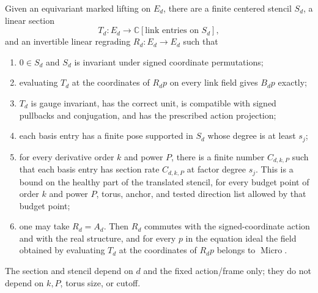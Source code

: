 \begin{theorem}
\label{thm:ex-marked-portfolio-section}
Given an equivariant marked lifting on $E_d$, there are a finite centered stencil $S_d$, a linear section
\[
       T_d:E_d\longrightarrow\mathbb C[\text{link entries on }S_d],
\]
and an invertible linear regrading $R_d:E_d\to E_d$ such that
\begin{enumerate}
\item $0\in S_d$ and $S_d$ is invariant under signed coordinate
  permutations;
\item evaluating $T_d$ at the coordinates of $R_dp$ on every link field
  gives $B_dp$ exactly;
\item $T_d$ is gauge invariant, has the correct unit, is compatible with
  signed pullbacks and conjugation, and has the prescribed action
  projection;
\item each basis entry has a finite pose supported in $S_d$ whose degree
  is at least $s_j$;
\item for every derivative order $k$ and power $P$, there is a finite
  number $C_{d,k,P}$ such that each basis entry has section rate
  $C_{d,k,P}$ at factor degree $s_j$. This is a bound on the healthy part
  of the translated stencil, for every budget point of order $k$ and
  power $P$, torus, anchor, and tested direction list allowed by that
  budget point;
\item one may take $R_d=A_d$. Then $R_d$ commutes with the
  signed-coordinate action and with the real structure, and for every
  $p$ in the equation ideal the field obtained by evaluating $T_d$ at the
  coordinates of $R_dp$ belongs to $\operatorname{Micro}$.
\end{enumerate}
The section and stencil depend on $d$ and the fixed action/frame only;
they do not depend on $k,P$, torus size, or cutoff.
\end{theorem}
